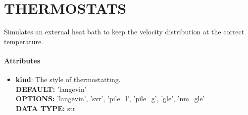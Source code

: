 \section{THERMOSTATS}
\label{THERMOSTATS}
Simulates an external heat bath to keep the velocity distribution at the correct temperature.
\paragraph{Attributes}
 \begin{itemize}
\item {\bf kind}:
 The style of thermostatting.
{\\ \bf DEFAULT: }'langevin'
{\\ \bf OPTIONS: }'langevin', 'svr', 'pile\_l', 'pile\_g', 'gle', 'nm\_gle'
{\\ \bf DATA TYPE: }str
\end{itemize}
 
